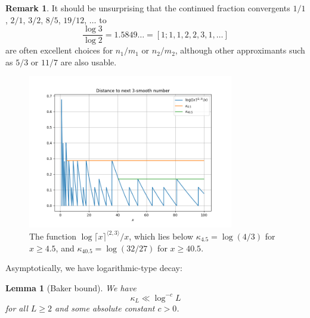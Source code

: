 \documentclass[12pt,a4paper,reqno]{amsart}
\numberwithin{equation}{section}
\theoremstyle{plain}
\newtheorem{lemma}[theorem]{Lemma}
\theoremstyle{definition}
\newtheorem{remark}[theorem]{Remark}
\begin{document}
\begin{remark}
It should be unsurprising that the continued fraction convergents $1/1$, $2/1$, $3/2$, $8/5$, $19/12$, $\dots$ to 
$$\frac{\log 3}{\log 2} = 1.5849\dots = [1; 1,1,2,2,3,1,\dots]$$
are often excellent choices for $n_1/m_1$ or $n_2/m_2$, although other approximants such as $5/3$ or $11/7$ are also usable.
\end{remark}

\begin{figure}
  \centering
  \includegraphics[width=0.8\textwidth]{next_smooth.png}
  \caption{The function $\log \lceil x \rceil^{\langle 2,3 \rangle}/x$, which lies below $\kappa_{4.5} = \log(4/3)$ for $x \geq 4.5$, and $\kappa_{40.5} = \log(32/27)$ for $x \geq 40.5$. 
  }\label{fig:nextsmooth}
  \end{figure}

Asymptotically, we have logarithmic-type decay:

\begin{lemma}[Baker bound]\label{baker} We have
  $$ \kappa_L \ll \log^{-c} L$$
for all $L \geq 2$ and some absolute constant $c>0$.
\end{lemma}
\end{document}
